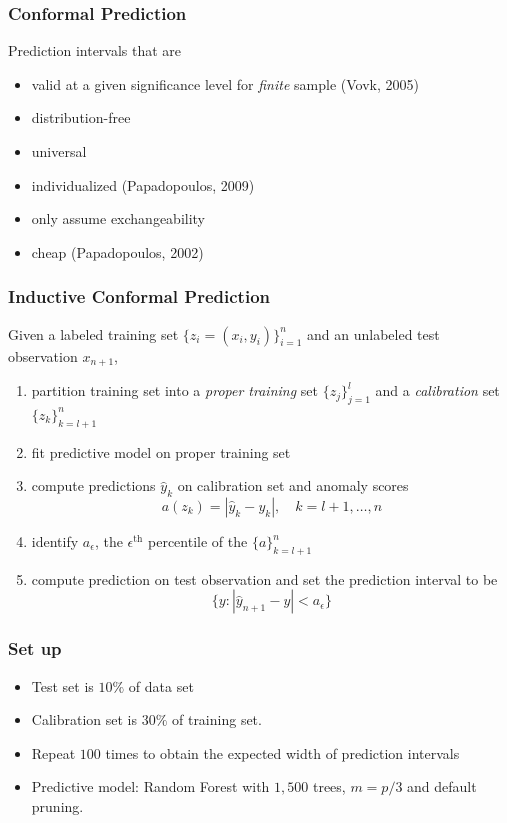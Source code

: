 \documentclass{beamer}
\begin{document}
\begin{frame} \frametitle{Conformal Prediction}

Prediction intervals that are
\begin{itemize}
	\item valid at a given significance level for \textit{finite} sample (Vovk, 2005)
	\item distribution-free
	\item universal
	\item individualized (Papadopoulos, 2009)
	\item only assume exchangeability
	\item cheap (Papadopoulos, 2002)
\end{itemize}
\end{frame}


\begin{frame} \frametitle{Inductive Conformal Prediction}

Given a labeled training set $\{z_i = (x_i, y_i)\}_{i=1}^n$ and an unlabeled test observation $x_{n+1}$,
\begin{enumerate}
	\item partition training set into a \textit{proper training} set $\{z_j\}_{j=1}^l$ and a \textit{calibration} set $\{z_k \}_{k=l+1}^n$
	\item fit predictive model on proper training set
	\item compute predictions $\hat{y}_k$ on calibration set and anomaly scores
	$$a(z_k) = |\hat{y}_k - y_k|, \quad k = l+1, \dots, n$$
	\item identify $a_\epsilon$, the $\epsilon^{\text{th}}$ percentile of the $\{a\}_{k=l+1}^n$
	\item compute prediction on test observation and set the prediction interval to be
	$$\{y: |\hat{y}_{n+1} - y| < a_\epsilon\}$$
	\end{enumerate}
\end{frame}


\begin{frame} \frametitle{Set up}
\begin{itemize}
	\item Test set is $10\%$ of data set
	\item Calibration set is $30\%$ of training set.
	\item Repeat $100$ times to obtain the expected width of prediction intervals	
	\item Predictive model: Random Forest with $1,500$ trees, $m = p/3$ and default pruning.
\end{itemize}
\end{frame}
\end{document}
